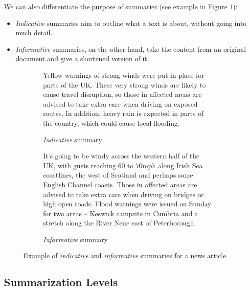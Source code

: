 \noindent
We can also differentiate the purpose of summaries \cite{radev_introduction_2002} (see example in Figure \ref{fig:indicative_informative_summaries}):

\begin{itemize}
\item \textit{Indicative} summaries aim to outline what a text is about, without going into much detail.
\item \textit{Informative} summaries, on the other hand, take the content from an original document and give a shortened version of it.
\end{itemize}

\begin{figure}[H]
\begin{subfigure}{\textwidth}
\begin{displayquote}
Yellow warnings of strong winds were put in place for parts of the UK. These very strong winds are likely to cause travel disruption, so those in affected areas are advised to take extra care when driving on exposed routes. In addition, heavy rain is expected in parts of the country, which could cause local flooding.
\end{displayquote}
\caption{\textit{Indicative} summary}
\vspace{\baselineskip}
\end{subfigure}
\begin{subfigure}{\textwidth}
\begin{displayquote}
It’s going to be windy across the western half of the UK, with gusts reaching 60 to 70mph along Irish Sea coastlines, the west of Scotland and perhaps some English Channel coasts. Those in affected areas are advised to take extra care when driving on bridges or high open roads. Flood warnings were issued on Sunday for two areas – Keswick campsite in Cumbria and a stretch along the River Nene east of Peterborough.
\end{displayquote}
\caption{\textit{Informative} summary}
\end{subfigure}
\caption[]{Example of \textit{indicative} and \textit{informative} summaries for a news article\footnotemark}
\label{fig:indicative_informative_summaries}
\end{figure}


\subsection{Summarization Levels}


